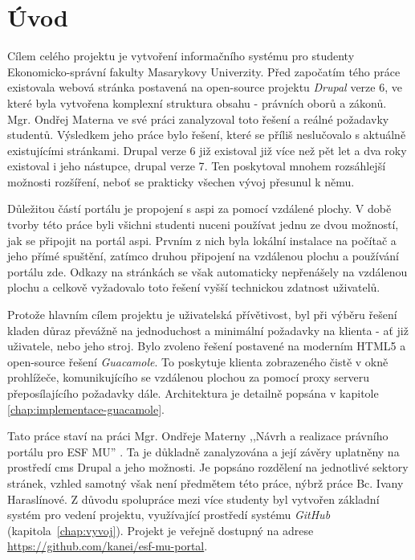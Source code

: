 \chapter{Úvod}
Cílem celého projektu je vytvoření informačního systému pro studenty Ekonomicko-správní fakulty Masarykovy Univerzity. Před započatím tého práce existovala webová stránka postavená na open-source projektu \emph{Drupal} verze 6, ve které byla vytvořena komplexní struktura obsahu - právních oborů a zákonů. Mgr. Ondřej Materna ve své práci zanalyzoval toto řešení a reálné požadavky studentů. Výsledkem jeho práce bylo řešení, které se příliš neslučovalo s aktuálně existujícími stránkami. Drupal verze 6 již existoval již více než pět let a dva roky existoval i jeho nástupce, drupal verze 7\cite{website:wiki:drupal}. Ten poskytoval mnohem rozsáhlejší možnosti rozšíření, neboť se prakticky všechen vývoj přesunul k němu. 

Důležitou částí portálu je propojení s \gls{aspi} za pomocí vzdálené plochy. V době tvorby této práce byli všichni studenti nuceni používat jednu ze dvou možností, jak se připojit na portál \gls{aspi}. Prvním z nich byla lokální instalace na počítač a jeho přímé spuštění, zatímco druhou připojení na vzdálenou plochu a používání portálu zde. Odkazy na stránkách se však automaticky nepřenášely na vzdálenou plochu a celkově vyžadovalo toto řešení vyšší technickou zdatnost uživatelů.

Protože hlavním cílem projektu je uživatelská přívětivost, byl při výběru řešení kladen důraz převážně na jednoduchost a minimální požadavky na klienta - ať již uživatele, nebo jeho stroj. Bylo zvoleno řešení postavené na moderním HTML5 a open-source řešení \emph{Guacamole}. To poskytuje klienta zobrazeného čistě v okně prohlížeče, komunikujícího se vzdálenou plochou za pomocí proxy serveru přeposílajícího požadavky dále. Architektura je detailně popsána v kapitole \ref{chap:implementace-guacamole}.

Tato práce staví na práci Mgr. Ondřeje Materny ,,Návrh a realizace právního portálu pro ESF MU'' \cite{omaterna2013}. Ta je důkladně zanalyzována a její závěry uplatněny na prostředí \gls{cms} Drupal a jeho možnosti. Je popsáno rozdělení na jednotlivé sektory stránek, vzhled samotný však není předmětem této práce, nýbrž práce Bc. Ivany Haraslínové. Z důvodu spolupráce mezi více studenty byl vytvořen základní systém pro vedení projektu, využívající prostředí systému \emph{GitHub} (kapitola~\ref{chap:vyvoj}). Projekt je veřejně dostupný na adrese \url{https://github.com/kanei/esf-mu-portal}.
